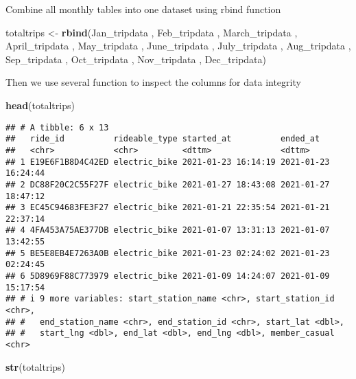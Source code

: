 \documentclass[
]{article}
\newenvironment{Shaded}{\begin{snugshade}}{\end{snugshade}}
\newcommand{\FunctionTok}[1]{\textcolor[rgb]{0.13,0.29,0.53}{\textbf{#1}}}
\newcommand{\NormalTok}[1]{#1}
\newcommand{\OtherTok}[1]{\textcolor[rgb]{0.56,0.35,0.01}{#1}}
\begin{document}
Combine all monthly tables into one dataset using rbind function

\begin{Shaded}
\begin{Highlighting}[]
\NormalTok{totaltrips }\OtherTok{\textless{}{-}} \FunctionTok{rbind}\NormalTok{(Jan\_tripdata , Feb\_tripdata , March\_tripdata , April\_tripdata , May\_tripdata , June\_tripdata , July\_tripdata , Aug\_tripdata , Sep\_tripdata , Oct\_tripdata , Nov\_tripdata , Dec\_tripdata)}
\end{Highlighting}
\end{Shaded}

Then we use several function to inspect the columns for data integrity

\begin{Shaded}
\begin{Highlighting}[]
\FunctionTok{head}\NormalTok{(totaltrips)}
\end{Highlighting}
\end{Shaded}

\begin{verbatim}
## # A tibble: 6 x 13
##   ride_id          rideable_type started_at          ended_at           
##   <chr>            <chr>         <dttm>              <dttm>             
## 1 E19E6F1B8D4C42ED electric_bike 2021-01-23 16:14:19 2021-01-23 16:24:44
## 2 DC88F20C2C55F27F electric_bike 2021-01-27 18:43:08 2021-01-27 18:47:12
## 3 EC45C94683FE3F27 electric_bike 2021-01-21 22:35:54 2021-01-21 22:37:14
## 4 4FA453A75AE377DB electric_bike 2021-01-07 13:31:13 2021-01-07 13:42:55
## 5 BE5E8EB4E7263A0B electric_bike 2021-01-23 02:24:02 2021-01-23 02:24:45
## 6 5D8969F88C773979 electric_bike 2021-01-09 14:24:07 2021-01-09 15:17:54
## # i 9 more variables: start_station_name <chr>, start_station_id <chr>,
## #   end_station_name <chr>, end_station_id <chr>, start_lat <dbl>,
## #   start_lng <dbl>, end_lat <dbl>, end_lng <dbl>, member_casual <chr>
\end{verbatim}

\begin{Shaded}
\begin{Highlighting}[]
\FunctionTok{str}\NormalTok{(totaltrips)}
\end{Highlighting}
\end{Shaded}
\end{document}
